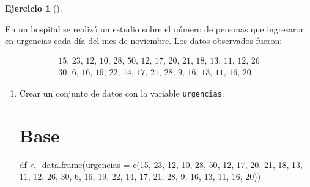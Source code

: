 \documentclass[
  spanish,
  a4paper,
]{scrreport}
\newenvironment{Shaded}{\begin{snugshade}}{\end{snugshade}}
\newcommand{\AttributeTok}[1]{\textcolor[rgb]{0.40,0.45,0.13}{#1}}
\newcommand{\DecValTok}[1]{\textcolor[rgb]{0.68,0.00,0.00}{#1}}
\newcommand{\FunctionTok}[1]{\textcolor[rgb]{0.28,0.35,0.67}{#1}}
\newcommand{\NormalTok}[1]{\textcolor[rgb]{0.00,0.23,0.31}{#1}}
\newcommand{\OtherTok}[1]{\textcolor[rgb]{0.00,0.23,0.31}{#1}}
\theoremstyle{definition}
\newtheorem{exercise}{Ejercicio}[chapter]
\theoremstyle{remark}
\begin{document}
\begin{exercise}[]\protect\hypertarget{exr-frecuencias-graficos-urgencias}{}\label{exr-frecuencias-graficos-urgencias}

En un hospital se realizó un estudio sobre el número de personas que
ingresaron en urgencias cada día del mes de noviembre. Los datos
observados fueron:

\[
\begin{array}{c}
\mbox{15, 23, 12, 10, 28, 50, 12, 17, 20, 21, 18, 13, 11, 12, 26} \\
\mbox{30, 6, 16, 19, 22, 14, 17, 21, 28, 9, 16, 13, 11, 16, 20}
\end{array}
\]

\begin{enumerate}
\def\labelenumi{\alph{enumi}.}
\item
  Crear un conjunto de datos con la variable \texttt{urgencias}.

  \begin{tcolorbox}[enhanced jigsaw, breakable, leftrule=.75mm, toptitle=1mm, rightrule=.15mm, opacitybacktitle=0.6, left=2mm, colframe=quarto-callout-tip-color-frame, titlerule=0mm, toprule=.15mm, opacityback=0, bottomtitle=1mm, coltitle=black, colbacktitle=quarto-callout-tip-color!10!white, title=\textcolor{quarto-callout-tip-color}{\faLightbulb}\hspace{0.5em}{Solución}, arc=.35mm, bottomrule=.15mm, colback=white]

  \section{Base}

\begin{Shaded}
\begin{Highlighting}[]
\NormalTok{df }\OtherTok{\textless{}{-}} \FunctionTok{data.frame}\NormalTok{(}\AttributeTok{urgencias =} \FunctionTok{c}\NormalTok{(}\DecValTok{15}\NormalTok{, }\DecValTok{23}\NormalTok{, }\DecValTok{12}\NormalTok{, }\DecValTok{10}\NormalTok{, }\DecValTok{28}\NormalTok{, }\DecValTok{50}\NormalTok{, }\DecValTok{12}\NormalTok{, }\DecValTok{17}\NormalTok{, }\DecValTok{20}\NormalTok{, }\DecValTok{21}\NormalTok{, }\DecValTok{18}\NormalTok{, }\DecValTok{13}\NormalTok{, }\DecValTok{11}\NormalTok{, }\DecValTok{12}\NormalTok{, }\DecValTok{26}\NormalTok{, }\DecValTok{30}\NormalTok{, }\DecValTok{6}\NormalTok{, }\DecValTok{16}\NormalTok{, }\DecValTok{19}\NormalTok{, }\DecValTok{22}\NormalTok{, }\DecValTok{14}\NormalTok{, }\DecValTok{17}\NormalTok{, }\DecValTok{21}\NormalTok{, }\DecValTok{28}\NormalTok{, }\DecValTok{9}\NormalTok{, }\DecValTok{16}\NormalTok{, }\DecValTok{13}\NormalTok{, }\DecValTok{11}\NormalTok{, }\DecValTok{16}\NormalTok{, }\DecValTok{20}\NormalTok{))}
\end{Highlighting}
\end{Shaded}


\end{tcolorbox}
\end{enumerate}
\end{exercise}
\end{document}
